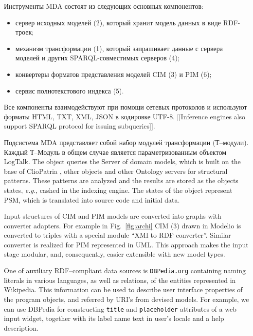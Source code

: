\documentclass[conference]{IEEEtran} \IEEEoverridecommandlockouts
\begin{document}
Инструменты MDA состоят из следующих основных компонентов: \begin{itemize} \item сервер исходных моделей (2), который хранит модель данных в виде RDF-троек; \item механизм трансформации (1), который запрашивает данные с сервера моделей и других SPARQL-совместимых серверов (4); \item конвертеры форматов представления моделей CIM (3) и PIM (6); \item сервис полнотекстового индекса (5). \end{itemize} 

Все компоненты взаимодействуют при помощи сетевых протоколов и используют форматы HTML, TXT, XML, JSON в кодировке UTF-8. [[Inference engines also support SPARQL protocol for issuing subqueries]]. 

Подсистема MDA представляет собой набор модулей трансформации (Т--модули). Каждый Т--Модуль в общем случае является параметризованным объектом LogTalk. The object queries the Server of domain models, which is built on the base of ClioPatria \cite{Clio}, other objects and other Ontology servers for structural patterns. These patterns are analyzed and the results are stored as the objects states, \emph{e.g.}, cashed in the indexing engine. The states of the object represent PSM, which is translated into source code and initial data. 

Input structures of CIM and PIM models are converted into graphs with converter adapters. For example in Fig.~\ref{fig:archi} CIM (3) drawn in Modelio \cite{modelio} is converted to triples with a special module ``XMI to RDF converter''. Similar converter is realized for PIM represented in UML. This approach makes the input stage modular, and, consequently, easier extensible with new model types. 

One of auxiliary RDF--compliant data sources is \texttt{DBPedia.org} containing naming literals in various languages, as well as relations, of the entities represented in Wikipedia. This information can be used to describe user interface properties of the program objects, and referred by URI's from devised models. For example, we can use DBPedia for constructing \texttt{title} and \texttt{placeholder} attributes of a web input widget, together with its label name text in user's locale and a help description. 

\end{document}
